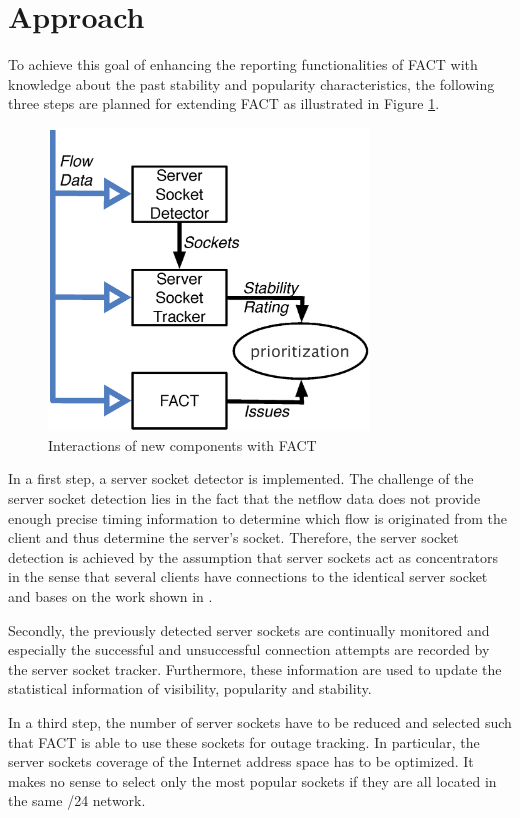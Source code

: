 \documentclass{sigcomm-alternate}
\begin{document}
\section{Approach}
To achieve this goal of enhancing the reporting functionalities of FACT
with knowledge about the past stability and popularity characteristics,
the following three steps are planned for extending FACT 
as illustrated in Figure \ref{fig:FACT}.

\begin{figure}[ht!]
\centering \includegraphics[width=8.5cm]{images/Approach_blockdiagram.eps}
\caption{Interactions of new components with FACT}
\label{fig:FACT}
\end{figure}


In a first step, a server socket detector is implemented. The
challenge of the server socket detection lies in the fact that the
netflow data does not provide enough precise timing information to
determine which flow is originated from the client and thus determine
the server's socket. Therefore, the server socket detection is
achieved by the assumption that server sockets act as concentrators
in the sense that several clients have connections to the identical
server socket and bases on the work shown in \cite{Schatzmann:Dissection,Schatzmann:Mining,Schatzmann:Tracing}.

Secondly, the previously detected server sockets are continually
monitored and especially the successful and unsuccessful connection
attempts are recorded by the server socket tracker. 
Furthermore, these information are used to update the statistical 
information of visibility, popularity and stability.

In a third step, the number of server sockets have to be reduced and
selected such that FACT is able to use these sockets
for outage tracking. In particular, the server sockets coverage of the
Internet address space has to be optimized. It makes no sense to select
only the most popular sockets if they are all located in the same /24
network.
\end{document}
